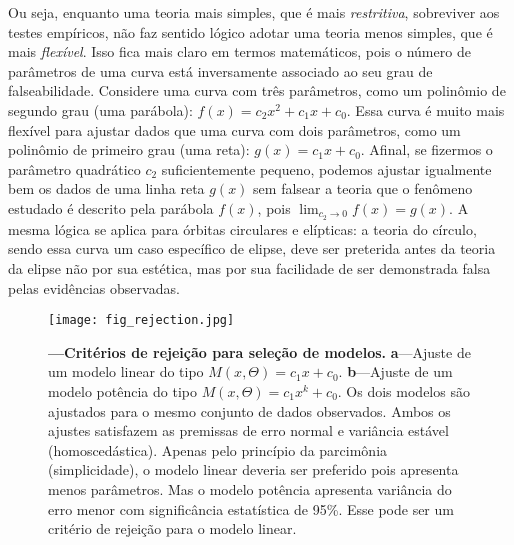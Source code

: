 \documentclass[./main.tex]{subfiles}
\begin{document}
\noindent Ou seja, enquanto uma teoria mais simples, que é mais \textit{restritiva}, sobreviver aos testes empíricos, não faz sentido lógico adotar uma teoria menos simples, que é mais \textit{flexível}. Isso fica mais claro em termos matemáticos, pois o número de parâmetros de uma curva está inversamente associado ao seu grau de falseabilidade. Considere uma curva com três parâmetros, como um polinômio de segundo grau (uma parábola): $f(x) = c_{2}x^{2} + c_{1}x + c_{0}$. Essa curva é muito mais flexível para ajustar dados que uma curva com dois parâmetros, como um polinômio de primeiro grau (uma reta): $g(x) = c_{1}x + c_{0}$. Afinal, se fizermos o parâmetro quadrático $c_{2}$ suficientemente pequeno, podemos ajustar igualmente bem os dados de uma linha reta $g(x)$ sem falsear a teoria que o fenômeno estudado é descrito pela parábola $f(x)$, pois $\lim_{c_{2}\to0} f(x) = g(x)$. A mesma lógica se aplica para órbitas circulares e elípticas: a teoria do círculo, sendo essa curva um caso específico de elipse, deve ser preterida antes da teoria da elipse não por sua estética, mas por sua facilidade de ser demonstrada falsa pelas evidências observadas.
\begin{figure}[t!] %
	\centering				
	\texttt{[image: fig\_rejection.jpg]}		
	\caption[Critérios de rejeição para seleção de modelos]
	{\textbf{---\;Critérios de rejeição para seleção de modelos.}
        \;\textbf{a}\;---\;Ajuste de um modelo linear do tipo $M(x, \Theta) = c_{1}x + c_{0}$. \;\textbf{b}\;---\;Ajuste de um modelo potência do tipo $M(x, \Theta) = c_{1}x^{k} + c_{0}$. Os dois modelos são ajustados para o mesmo conjunto de dados observados. Ambos os ajustes satisfazem as premissas de erro normal e variância estável (homoscedástica). Apenas pelo princípio da parcimônia (simplicidade), o modelo linear deveria ser preferido pois apresenta menos parâmetros. Mas o modelo potência apresenta variância do erro menor com significância estatística de 95\%. Esse pode ser um critério de rejeição para o modelo linear. 
	}
\label{fig:rejection}  %
\end{figure}
\end{document}
